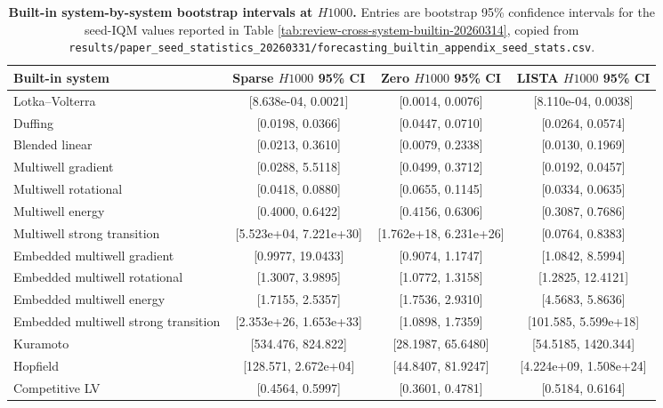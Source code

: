 \begin{table}[ht]
\centering
\tiny
\setlength{\tabcolsep}{4pt}
\begin{tabular}{p{}ccc}
\toprule
Built-in system & Sparse $H1000$ 95\% CI & Zero $H1000$ 95\% CI & LISTA $H1000$ 95\% CI \\
\midrule
Lotka--Volterra & [8.638e-04, 0.0021] & [0.0014, 0.0076] & [8.110e-04, 0.0038] \\
Duffing & [0.0198, 0.0366] & [0.0447, 0.0710] & [0.0264, 0.0574] \\
Blended linear & [0.0213, 0.3610] & [0.0079, 0.2338] & [0.0130, 0.1969] \\
Multiwell gradient & [0.0288, 5.5118] & [0.0499, 0.3712] & [0.0192, 0.0457] \\
Multiwell rotational & [0.0418, 0.0880] & [0.0655, 0.1145] & [0.0334, 0.0635] \\
Multiwell energy & [0.4000, 0.6422] & [0.4156, 0.6306] & [0.3087, 0.7686] \\
Multiwell strong transition & [5.523e+04, 7.221e+30] & [1.762e+18, 6.231e+26] & [0.0764, 0.8383] \\
Embedded multiwell gradient & [0.9977, 19.0433] & [0.9074, 1.1747] & [1.0842, 8.5994] \\
Embedded multiwell rotational & [1.3007, 3.9895] & [1.0772, 1.3158] & [1.2825, 12.4121] \\
Embedded multiwell energy & [1.7155, 2.5357] & [1.7536, 2.9310] & [4.5683, 5.8636] \\
Embedded multiwell strong transition & [2.353e+26, 1.653e+33] & [1.0898, 1.7359] & [101.585, 5.599e+18] \\
Kuramoto & [534.476, 824.822] & [28.1987, 65.6480] & [54.5185, 1420.344] \\
Hopfield & [128.571, 2.672e+04] & [44.8407, 81.9247] & [4.224e+09, 1.508e+24] \\
Competitive LV & [0.4564, 0.5997] & [0.3601, 0.4781] & [0.5184, 0.6164] \\
\bottomrule
\end{tabular}
\caption{\textbf{Built-in system-by-system bootstrap intervals at $H1000$.} Entries are bootstrap 95\% confidence intervals for the seed-IQM values reported in Table \ref{tab:review-cross-system-builtin-20260314}, copied from \texttt{results/paper\_seed\_statistics\_20260331/forecasting\_builtin\_appendix\_seed\_stats.csv}.}
\label{tab:review-cross-system-builtin-ci-h1000-20260314}
\end{table}

